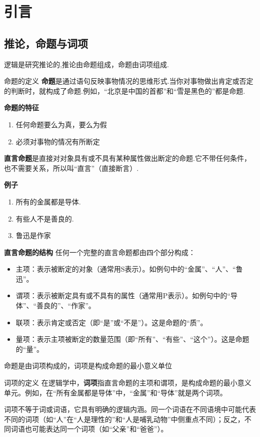\chapter{引言}
\section{推论，命题与词项}
逻辑是研究推论的,推论由命题组成，命题由词项组成.
\begin{mydefinition}{命题的定义}{}
	 \textbf{命题}是通过语句反映事物情况的思维形式.当你对事物做出肯定或否定的判断时，就构成了命题.例如，“北京是中国的首都”和“雪是黑色的”都是命题.
	
	\textbf{命题的特征}
	\begin{enumerate}
		\item 任何命题要么为真，要么为假
		\item 必须对事物的情况有所断定
	\end{enumerate}
	
	\textbf{直言命题}是直接对对象具有或不具有某种属性做出断定的命题.它不带任何条件，也不需要关系，所以叫“直言”（直接断言）.
	
	\textbf{例子}
	\begin{enumerate}
		\item 所有的金属都是导体.
		\item 有些人不是善良的.
		\item 鲁迅是作家
	\end{enumerate}
\end{mydefinition}

\textbf{直言命题的结构}
任何一个完整的直言命题都由四个部分构成：
\begin{itemize}
	\item 主项：表示被断定的对象（通常用S表示）。如例句中的“金属”、“人”、“鲁迅”。
	\item 谓项：表示被断定具有或不具有的属性（通常用P表示）。如例句中的“导体”、“善良的”、“作家”。
	\item 	联项：表示肯定或否定（即“是”或“不是”）。这是命题的“质”。
	\item 量项：表示主项被断定的数量范围（即“所有”、“有些”、“这个”）。这是命题的“量”。
\end{itemize}
命题是由词项构成的，词项是构成命题的最小意义单位
\begin{mydefinition}{词项的定义}{}
	在逻辑学中，\textbf{词项}指直言命题的主项和谓项，是构成命题的最小意义单元。例如，在“所有金属都是导体”中，“金属”和“导体”就是两个词项。
\end{mydefinition}
词项不等于词或词语，它具有明确的逻辑内涵。同一个词语在不同语境中可能代表不同的词项（如“人”在“人是理性的”和“人是哺乳动物”中侧重点不同）；反之，不同词语也可能表达同一个词项（如“父亲”和“爸爸”）。

